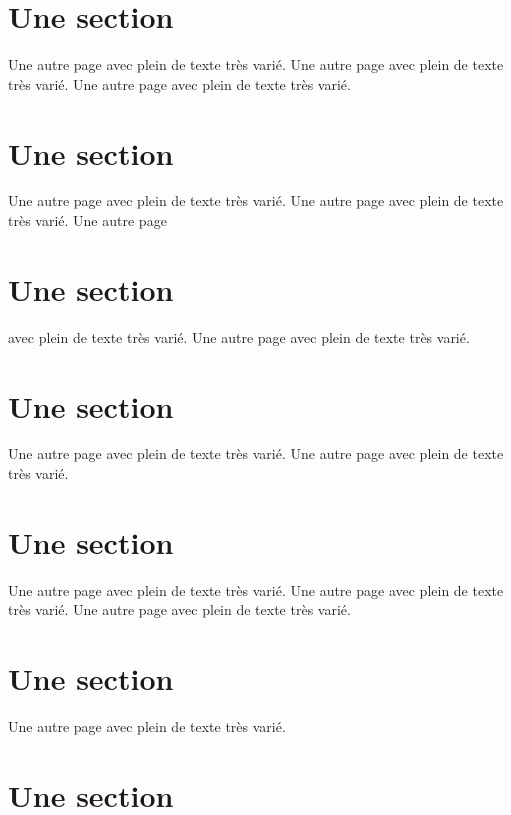 \documentclass[11pt]{thesul}
\begin{document}
\section{Une section}

Une autre page avec plein de texte très varié.
Une autre page avec plein de texte très varié.
Une autre page avec plein de texte très varié.

\section{Une section}

Une autre page avec plein de texte très varié.
Une autre page avec plein de texte très varié.
Une autre page


\section{Une section}

avec plein de texte très varié.
Une autre page avec plein de texte très varié.

\section{Une section}

Une autre page avec plein de texte très varié.
Une autre page avec plein de texte très varié.

\section{Une section}

Une autre page avec plein de texte très varié.
Une autre page avec plein de texte très varié.
Une autre page avec plein de texte très varié.

\section{Une section}

Une autre page avec plein de texte très varié.

\section{Une section}
\end{document}

